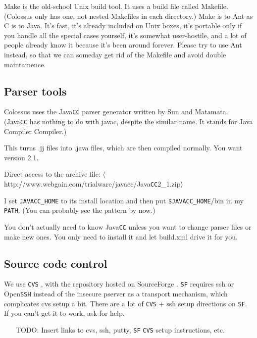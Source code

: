 \documentclass{article}
\begin{document}
Make is the old-school Unix build tool.  It uses a build file called
Makefile.  (Colossus only has one, not nested Makefiles in each
directory.)  Make is to Ant as C is to Java.  It's fast, it's already
included on Unix boxes, it's portable only if you handle all the special
cases yourself, it's somewhat user-hostile, and a lot of people already 
know it because it's been around forever.  Please try to use Ant instead, 
so that we can someday get rid of the Makefile and avoid double 
maintainence.

\subsection{Parser tools}

Colossus uses the Java\texttt{CC} \cite{JAVACC} parser generator written by Sun and Matamata.  
(Java\texttt{CC} has nothing to do with javac, despite the similar name.  It
stands for Java Compiler Compiler.)

This turns .jj files into .java files, which are then compiled normally.  
You want version 2.1.

Direct access to the archive file: $\langle$http://www.webgain.com/trialware/javacc/Java\texttt{CC}2\_1.zip$\rangle$

I set \texttt{JAVACC\_HOME} to its install location and then put \texttt{\$JAVACC\_HOME}/bin
in my \texttt{PATH}.  (You can probably see the pattern by now.)

You don't actually need to know Java\texttt{CC} unless you want to change parser
files or make new ones.  You only need to install it and let build.xml
drive it for you.

\subsection{Source code control}

We use \texttt{CVS} \cite{CVS}, with the repository hosted on SourceForge \cite{SOURCEFORGE}.
\texttt{SF} requires ssh \cite{SSH} or Open\texttt{SSH} \cite{OPENSSH} 
instead of the insecure pserver as a transport mechanism, which complicates
cvs setup a bit.  There are a lot of \texttt{CVS} + ssh setup directions on
\texttt{SF}.  If you can't get it to work, ask for help.

\begin{itemize}
\item[TODO:]  Insert links to cvs, ssh, putty, \texttt{SF} \texttt{CVS} setup instructions, etc.
\end{itemize}
\end{document}
